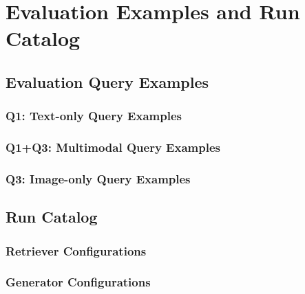 \chapter{Evaluation Examples and Run Catalog}
\label{ch:appendix:evaluation}

%
%
\section{Evaluation Query Examples}
\label{sec:appendix:queries}

\subsection{Q1: Text-only Query Examples}
\label{subsec:appendix:queries:q1}

\subsection{Q1+Q3: Multimodal Query Examples}
\label{subsec:appendix:queries:q1q3}

\subsection{Q3: Image-only Query Examples}
\label{subsec:appendix:queries:q3}

%
%
\section{Run Catalog}
\label{sec:appendix:runs}

\subsection{Retriever Configurations}
\label{subsec:appendix:runs:retriever}

\subsection{Generator Configurations}
\label{subsec:appendix:runs:generator}


